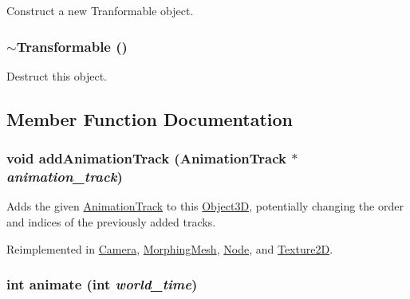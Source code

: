 Construct a new Tranformable object. \hypertarget{classm3g_1_1Transformable_89d9c7912ed11a30a312fd8f72b9ab22}{
\subsubsection[{$\sim$Transformable}]{\setlength{\rightskip}{0pt plus 5cm}$\sim${\bf Transformable} ()}}
\label{classm3g_1_1Transformable_89d9c7912ed11a30a312fd8f72b9ab22}


Destruct this object. 

\subsection{Member Function Documentation}
\hypertarget{classm3g_1_1Transformable_415c0b110f95410ded9b85e5d99a496b}{
\subsubsection[{addAnimationTrack}]{\setlength{\rightskip}{0pt plus 5cm}void addAnimationTrack ({\bf AnimationTrack} $\ast$ {\em animation\_\-track})}}
\label{classm3g_1_1Transformable_415c0b110f95410ded9b85e5d99a496b}


Adds the given \hyperlink{classm3g_1_1AnimationTrack}{AnimationTrack} to this \hyperlink{classm3g_1_1Object3D}{Object3D}, potentially changing the order and indices of the previously added tracks. 

Reimplemented in \hyperlink{classm3g_1_1Camera_415c0b110f95410ded9b85e5d99a496b}{Camera}, \hyperlink{classm3g_1_1MorphingMesh_415c0b110f95410ded9b85e5d99a496b}{MorphingMesh}, \hyperlink{classm3g_1_1Node_415c0b110f95410ded9b85e5d99a496b}{Node}, and \hyperlink{classm3g_1_1Texture2D_415c0b110f95410ded9b85e5d99a496b}{Texture2D}.\hypertarget{classm3g_1_1Transformable_8aad1ceab4c2a03609c8a42324ce484d}{
\subsubsection[{animate}]{\setlength{\rightskip}{0pt plus 5cm}int animate (int {\em world\_\-time})}}
\label{classm3g_1_1Transformable_8aad1ceab4c2a03609c8a42324ce484d}


